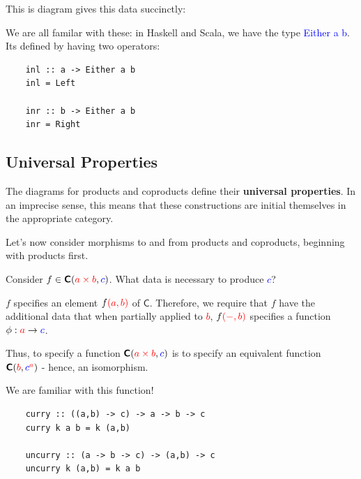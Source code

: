 \documentclass[tikz]{beamer}
\newcommand{\cat}[1]{\bm{ \mathsf{#1} }}
\newcommand{\cc}{\cat{C}}
\newcommand{\red}[1]{\textcolor{red}{#1}}
\newcommand{\mred}[1]{\textcolor{red}{$#1$}}
\newcommand{\blue}[1]{\textcolor{blue}{#1}}
\newcommand{\mblue}[1]{\textcolor{blue}{$#1$}}
\theoremstyle{definition}
\begin{document}
\begin{frame}[fragile]
	This is diagram gives this data succinctly: 
	
	\begin{center}
	\end{center}
\end{frame}

\begin{frame}[fragile]
	We are all familar with these: in Haskell and Scala, we have the type \blue{Either} \blue{a} \blue{b}. Its defined by having two operators: 
	
	\begin{verbatim}
	inl :: a -> Either a b
	inl = Left
	
	inr :: b -> Either a b
	inr = Right
	\end{verbatim}
\end{frame}

\subsection{Universal Properties}
\frame
{
	The diagrams for products and coproducts define their \textbf{universal properties}. In an imprecise sense, this means that these constructions are initial themselves in the appropriate category. 
}

\frame
{
	Let's now consider morphisms to and from products and coproducts, beginning with products first. 
}

\frame
{
	Consider $f \in \cc(\red{a \times b}, \blue{c})$. What data is necessary to produce \mblue{c}? 
}

\frame
{
	$f$ specifies an element $f \red{(a,b)}$ of $\cc$. Therefore, we require that $f$ have the additional data that when partially applied to \mred{b}, $f \red{(-,b)}$ specifies a function $\phi : \red{a} \to \blue{c}$. 
}

\frame
{
	Thus, to specify a function $\cc(\red{a \times b}, \blue{c})$ is to specify an equivalent function $\cc(\red{b}, \blue{c}^{\red{a}})$ - hence, an isomorphism. 
}

\begin{frame}[fragile]

	We are familiar with this function! 
	
	\begin{verbatim}
	curry :: ((a,b) -> c) -> a -> b -> c
	curry k a b = k (a,b)
	
	uncurry :: (a -> b -> c) -> (a,b) -> c
	uncurry k (a,b) = k a b  
	\end{verbatim}
\end{frame}
\end{document}
